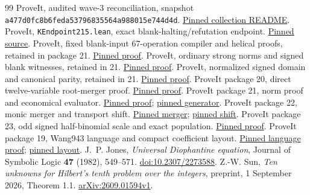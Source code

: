 \documentclass[11pt]{article}
\theoremstyle{remark}\newtheorem{remark}[theorem]{Remark}
\newcommand{\repo}{https://github.com/VladimirReshetnikov/ProveIt/blob/a477d0fc8b6feda53796835564a988015e744d4d/}
\newcommand{\coll}{SetTheory/Cardinals/docs/reports/hilbert-tenth-problem/con-zfc-diophantine-forms/}
\begin{document}





\begin{thebibliography}{99}\small
{}
ProveIt, audited wave-3 reconciliation, snapshot
\texttt{a477d0fc8b6feda53796835564a988015e744d4d}.
\href{\repo\coll README.md}{Pinned collection README}.
ProveIt, \texttt{KEndpoint215.lean}, exact blank-halting/refutation endpoint.
\href{\repo Computability/BusyBeaver/Lean/BusyBeaver/ZFC/KEndpoint215.lean}{Pinned source}.
ProveIt, fixed blank-input \(67\)-operation compiler and helical proofs,
retained in package 21.
\href{\repo\coll 21-norm12/upstream/FIXED_BLANK_67_PROOF.md}{Pinned proof}.
ProveIt, ordinary strong norms and signed blank witnesses, retained in 21.
\href{\repo\coll 21-norm12/upstream/ORDINARY_BLANK_PROOF.md}{Pinned proof}.
ProveIt, normalized signed domain and canonical parity, retained in 21.
\href{\repo\coll 21-norm12/upstream/SIGNED_DOMAIN_29.md}{Pinned proof}.
ProveIt package 20, direct twelve-variable root-merger proof.
\href{\repo\coll 20-root12/amalgamation/ROOT12_PROOF.md}{Pinned proof}.
ProveIt package 21, norm proof and economical evaluator.
\href{\repo\coll 21-norm12/proofs/NORM12_PROOF.md}{Pinned proof};
\href{\repo\coll 21-norm12/arithmetic/build_norm12.py}{pinned generator}.
ProveIt package 22, monic merger and transport shift.
\href{\repo\coll 22-monic12/proofs/merger_proof.md}{Pinned merger};
\href{\repo\coll 22-monic12/proofs/RETAINED59_PROOF.md}{pinned shift}.
ProveIt package 23, odd signed half-binomial scale and exact population.
\href{\repo\coll 23-separating12/proofs/ODD_SCALE_27_PROOF.md}{Pinned proof}.
ProveIt package 19, Wang943 language and compact coefficient layout.
\href{\repo\coll 19-wang943/compiler/WANG943_COEFFICIENTS.md}{Pinned language proof};
\href{\repo\coll 19-wang943/compiler/WANG943_COMPACT_LAYOUT.md}{pinned layout}.
J.~P. Jones, \emph{Universal Diophantine equation},
Journal of Symbolic Logic \textbf{47} (1982), 549--571.
\href{https://doi.org/10.2307/2273588}{doi:10.2307/2273588}.
Z.-W. Sun, \emph{Ten unknowns for Hilbert's tenth problem over the integers},
preprint, 1 September 2026, Theorem 1.1.
\href{https://arxiv.org/abs/2609.01594}{arXiv:2609.01594v1}.
\end{thebibliography}
\end{document}
